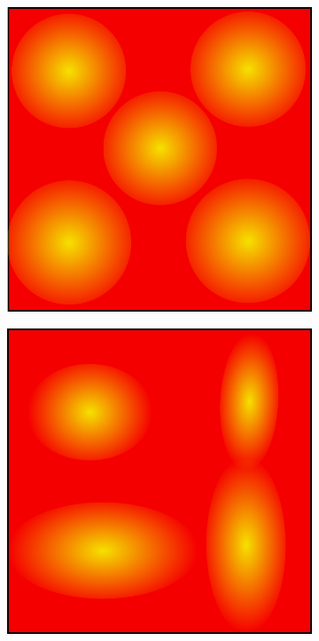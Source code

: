 \begin{figure}[t]
  \centering
  \begin{subfigure}[b]{0.2\textwidth}
      \centering
      \includegraphics[width=\textwidth]{papers/swarm-intelligence2021/img/scenario/standard}
      \caption{}
      \label{fig:standard}
  \end{subfigure}
  \hfill
  \begin{subfigure}[b]{0.2\textwidth}
      \centering
      \includegraphics[width=\textwidth]{papers/swarm-intelligence2021/img/scenario/stretched}

\end{subfigure}
\end{figure}
